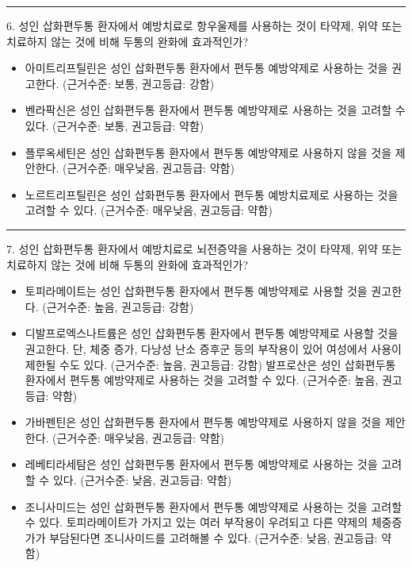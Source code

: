 \documentclass[]{book}
\begin{document}
\begin{center}\rule{0.5\linewidth}{\linethickness}\end{center}

6. 성인 삽화편두통 환자에서 예방치료로 항우울제를 사용하는 것이 타약제, 위약 또는 치료하지 않는 것에 비해 두통의 완화에 효과적인가?

\begin{itemize}
\item
  아미트리프틸린은 성인 삽화편두통 환자에서 편두통 예방약제로 사용하는 것을 권고한다. (근거수준: 보통, 권고등급: 강함)
\item
  벤라팍신은 성인 삽화편두통 환자에서 편두통 예방약제로 사용하는 것을 고려할 수 있다. (근거수준: 보통, 권고등급: 약함)
\item
  플루옥세틴은 성인 삽화편두통 환자에서 편두통 예방약제로 사용하지 않을 것을 제안한다. (근거수준: 매우낮음, 권고등급: 약함)
\item
  노르트리프틸린은 성인 삽화편두통 환자에서 편두통 예방치료제로 사용하는 것을 고려할 수 있다. (근거수준: 매우낮음, 권고등급: 약함)
\end{itemize}

\begin{center}\rule{0.5\linewidth}{\linethickness}\end{center}

7. 성인 삽화편두통 환자에서 예방치료로 뇌전증약을 사용하는 것이 타약제, 위약 또는 치료하지 않는 것에 비해 두통의 완화에 효과적인가?

\begin{itemize}
\item
  토피라메이트는 성인 삽화편두통 환자에서 편두통 예방약제로 사용할 것을 권고한다. (근거수준: 높음, 권고등급: 강함)
\item
  디발프로엑스나트륨은 성인 삽화편두통 환자에서 편두통 예방약제로 사용할 것을 권고한다. 단, 체중 증가, 다낭성 난소 증후군 등의 부작용이 있어 여성에서 사용이 제한될 수도 있다. (근거수준: 높음, 권고등급: 강함) 발프로산은 성인 삽화편두통 환자에서 편두통 예방약제로 사용하는 것을 고려할 수 있다. (근거수준: 높음, 권고등급: 약함)
\item
  가바펜틴은 성인 삽화편두통 환자에서 편두통 예방약제로 사용하지 않을 것을 제안한다. (근거수준: 매우낮음, 권고등급: 약함)
\item
  레베티라세탐은 성인 삽화편두통 환자에서 편두통 예방약제로 사용하는 것을 고려할 수 있다. (근거수준: 낮음, 권고등급: 약함)
\item
  조니사미드는 성인 삽화편두통 환자에서 편두통 예방약제로 사용하는 것을 고려할 수 있다. 토피라메이트가 가지고 있는 여러 부작용이 우려되고 다른 약제의 체중증가가 부담된다면 조니사미드를 고려해볼 수 있다. (근거수준: 낮음, 권고등급: 약함)
\end{itemize}
\end{document}
